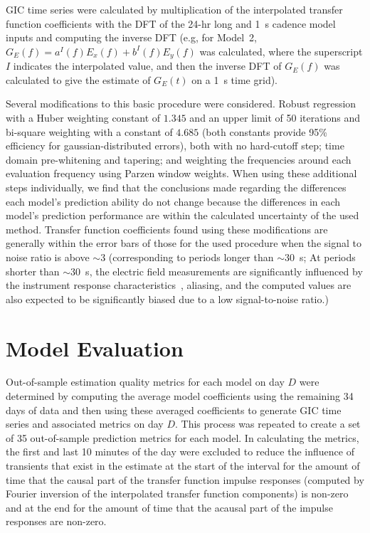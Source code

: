 \documentclass[draft,linenumbers]{agujournal2018}
\begin{document}
GIC time series were calculated by multiplication of the interpolated transfer function coefficients with the DFT of the 24-hr long and 1~s cadence model inputs and computing the inverse DFT (e.g, for Model~2, $G_E(f)=a^I(f)E_x(f)+b^I(f)E_y(f)$ was calculated, where the superscript $I$ indicates the interpolated value, and then the inverse DFT of $G_E(f)$ was calculated to give the estimate of $G_E(t)$ on a 1~s time grid).

Several modifications to this basic procedure were considered. Robust regression \citep{Egbert1986} with a Huber weighting constant of $1.345$ and an upper limit of 50 iterations and bi-square weighting with a constant of $4.685$ (both constants provide 95\% efficiency for gaussian-distributed errors), both with no hard-cutoff step; time domain pre-whitening and tapering; and weighting the frequencies around each evaluation frequency using Parzen window weights. When using these additional steps individually, we find that the conclusions made regarding the differences each model's prediction ability do not change because the differences in each model's prediction performance are within the calculated uncertainty of the used method. Transfer function coefficients found using these modifications are generally within the error bars of those for the used procedure when the signal to noise ratio is above $\sim$3 (corresponding to periods longer than $\sim$30~s; At periods shorter than $\sim$30~s, the electric field measurements are significantly influenced by the instrument response characteristics~\citep{Fujii2015}, aliasing, and the computed values are also expected to be significantly biased due to a low signal-to-noise ratio.)

\section{Model Evaluation}
\label{section:Model_Evaluation}

Out-of-sample estimation quality metrics for each model on day $D$ were determined by computing the average model coefficients using the remaining 34 days of data and then using these averaged coefficients to generate GIC time series and associated metrics on day $D$. This process was repeated to create a set of 35 out-of-sample prediction metrics for each model. In calculating the metrics, the first and last 10 minutes of the day were excluded to reduce the influence of transients that exist in the estimate at the start of the interval for the amount of time that the causal part of the transfer function impulse responses (computed by Fourier inversion of the interpolated transfer function components) is non-zero and at the end for the amount of time that the acausal part of the impulse responses are non-zero.
\end{document}
